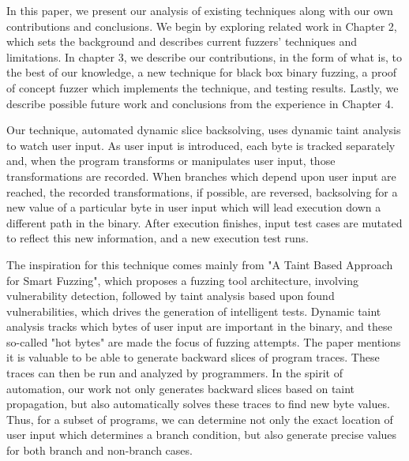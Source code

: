 \documentclass[11pt,expanded,copyright]{fsuthesis}
\begin{document}
In this paper, we present our analysis of existing techniques along with our own contributions and conclusions. We begin by exploring related work in Chapter 2, which sets the background and describes current fuzzers' techniques and limitations. In chapter 3, we describe our contributions, in the form of what is, to the best of our knowledge, a new technique for black box binary fuzzing, a proof of concept fuzzer which implements the technique, and testing results. Lastly, we describe possible future work and conclusions from the experience in Chapter 4.

Our technique, automated dynamic slice backsolving, uses dynamic taint analysis to watch user input. As user input is introduced, each byte is tracked separately and, when the program transforms or manipulates user input, those transformations are recorded. When branches which depend upon user input are reached, the recorded transformations, if possible, are reversed, backsolving for a new value of a particular byte in user input which will lead execution down a different path in the binary. After execution finishes, input test cases are mutated to reflect this new information, and a new execution test runs.

The inspiration for this technique comes mainly from "A Taint Based Approach for Smart Fuzzing", which proposes a fuzzing tool architecture, involving vulnerability detection, followed by taint analysis based upon found vulnerabilities, which drives the generation of intelligent tests. Dynamic taint analysis tracks which bytes of user input are important in the binary, and these so-called "hot bytes" are made the focus of fuzzing attempts. The paper mentions it is valuable to be able to generate backward slices of program traces. These traces can then be run and analyzed by programmers. In the spirit of automation, our work not only generates backward slices based on taint propagation, but also automatically solves these traces to find new byte values. Thus, for a subset of programs, we can determine not only the exact location of user input which determines a branch condition, but also generate precise values for both branch and non-branch cases.
\end{document}
